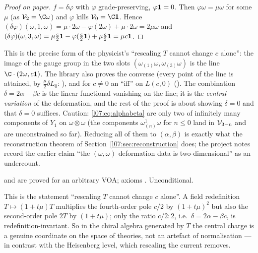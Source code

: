 \begin{proof}[Proof on paper]
$f = \delta\varphi$ with $\varphi$ grade-preserving, $\varphi\mathbf{1} = 0$. Then $\varphi\omega = \mu\omega$ for
some $\mu$ (as $\lsevenV_2 = \C\omega$) and $\varphi$ kills $\lsevenV_0 = \C\lsevenvac$. Hence
$(\delta\varphi)(\omega,1,\omega) = \mu\cdot2\omega - \varphi(2\omega) + \mu\cdot2\omega = 2\mu\omega$ and
$(\delta\varphi)(\omega,3,\omega) = \mu\frac c2\mathbf{1} - \varphi(\frac c2\mathbf{1}) + \mu\frac c2\mathbf{1} = \mu c\mathbf{1}$.
\end{proof}

\begin{dictionary}
This is the precise form of the physicist's ``rescaling $T$ cannot change $c$ alone'': the image
of the gauge group in the two slots $(\omega_{(1)}\omega,\omega_{(3)}\omega)$ is the line
$\C\cdot(2\omega, c\lsevenvac)$. The library also proves the converse (every point of the line is attained,
by $\frac\mu2\delta L_0$: ), and for $c\ne0$ an
``iff'' on $L(c,0)$ (). The combination
$\delta = 2\alpha-\beta c$ is the linear functional vanishing on the line; it is the \emph{central
variation} of the deformation, and the rest of the proof is about showing $\delta = 0$ and that
$\delta = 0$ suffices. Caution: \eqref{l07:eq:alphabeta} are only two of infinitely many components
of $Y_1$ on $\omega\otimes\omega$ (the components $\omega^1_{(n)}\omega$ for $n\le0$ land in $\mathcal{V}_{3-n}$
and are unconstrained so far). Reducing all of them to $(\alpha,\beta)$ is exactly what the
reconstruction theorem of Section~\ref{l07:sec:reconstruction} does; the project notes record the
earlier claim ``the $(\omega,\omega)$ deformation data is two-dimensional'' as an undercount.
\end{dictionary}

\begin{status}
 and  are proved for an
arbitrary VOA; axioms . Unconditional.
\end{status}

\begin{physics}
This is the statement ``rescaling $T$ cannot change $c$ alone''. A field redefinition $T\mapsto(1+t\mu)T$ multiplies
the fourth-order pole $c/2$ by $(1+t\mu)^2$ but also the second-order pole $2T$ by $(1+t\mu)$; only the ratio
$c/2:2$, i.e.\ $\delta=2\alpha-\beta c$, is redefinition-invariant. So in the chiral algebra generated by $T$ the
central charge is a genuine coordinate on the space of theories, not an artefact of normalisation --- in
contrast with the Heisenberg level, which rescaling the current removes.
\end{physics}

